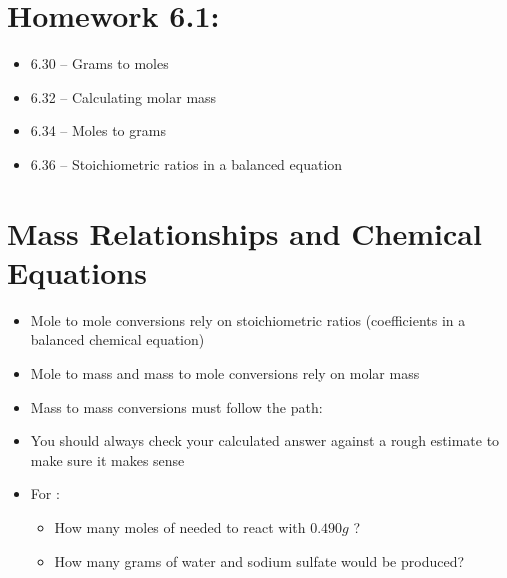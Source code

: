 \documentclass[12pt, openany, letterpaper]{memoir}
\begin{document}
\section*{Homework 6.1:}
\begin{itemize}
  \item 6.30 -- Grams to moles
  \item 6.32 -- Calculating molar mass
  \item 6.34 -- Moles to grams
  \item 6.36 -- Stoichiometric ratios in a balanced equation
\end{itemize}

\section{Mass Relationships and Chemical Equations}
\begin{itemize}
	\item Mole to mole conversions rely on stoichiometric ratios (coefficients in a balanced chemical equation)
	\item Mole to mass and mass to mole conversions rely on molar mass
	\item Mass to mass conversions must follow the path: 
	\item You should always check your calculated answer against a rough estimate to make sure it makes sense
	\item For :
	      \begin{itemize}
		      \item How many  moles of  needed to react with $0.490g$ ?
		      \item How many grams of water and sodium sulfate would be produced?
	      \end{itemize}
\end{itemize}
\end{document}
